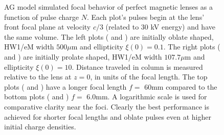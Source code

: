 \begin{figure}
  \centering
  \centerline{
  }
  \centerline{
  }
  \caption[AG model simulated focal behavior of perfect magnetic lenses as a function of pulse charge $N$]{
    AG model simulated focal behavior of perfect magnetic lenses as a function of pulse charge $N$.
    Each plot's pulses begin at the lens' front focal plane at velocity $c/3$ (related to 30 kV energy) and have the same volume.
    The left plots ( and ) are initially oblate shaped, HW1/eM width $ 500 \mu \text{m}$ and ellipticity $ \xi ( 0 ) = 0.1 $.
    The right plots ( and ) are initially prolate shaped, HW1/eM width $ 107.7 \mu \text{m}$ and ellipticity $ \xi ( 0 ) = 10 $.
    Distance traveled in column is measured relative to the lens at $z=0$, in units of the focal length.
    The top plots ( and ) have a longer focal length $f = $ 60mm compared to the bottom plots ( and ) $ f = $ 6.0mm.
    A logarithmic scale is used for comparative clarity near the foci.
    Clearly the best performance is achieved for shorter focal lengths and oblate pulses  even at higher initial charge densities.
  }
  \label{fig:focus_lens_charge}
\end{figure}

